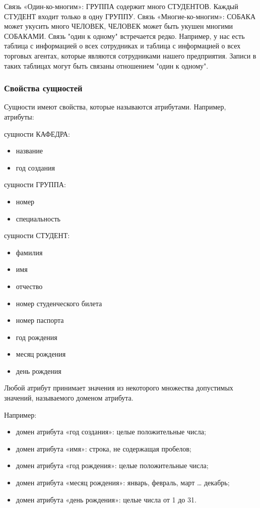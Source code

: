 \documentclass[a4paper]{article}
\begin{document}
Связь «Один-ко-многим»: ГРУППА содержит много СТУДЕНТОВ. Каждый СТУДЕНТ входит только в одну ГРУППУ. Связь «Многие-ко-многим»: СОБАКА может укусить много ЧЕЛОВЕК, ЧЕЛОВЕК может быть укушен многими СОБАКАМИ. Связь "один к одному" встречается редко. Например, у нас есть таблица с информацией о всех сотрудниках и таблица с информацией о всех торговых агентах, которые являются сотрудниками нашего предприятия. Записи в таких таблицах могут быть связаны отношением "один к одному".

\subsubsection{Свойства сущностей}
Сущности имеют свойства, которые называются атрибутами.
Например, атрибуты:

сущности КАФЕДРА:
    \begin{itemize}
      \item название
      \item год создания
    \end{itemize}

сущности ГРУППА:
\begin{itemize}
    \item номер
    \item специальность
\end{itemize}

сущности СТУДЕНТ:
\begin{itemize}
\item фамилия
\item имя
\item отчество
\item номер студенческого билета
\item номер паспорта
\item год рождения
\item месяц рождения
\item день рождения
\end{itemize}

Любой атрибут принимает значения из некоторого множества допустимых значений, называемого доменом атрибута.

Например:
\begin{itemize}
    \item домен атрибута «год создания»: целые положительные числа;
    \item домен атрибута «имя»: строка, не содержащая пробелов;
    \item домен атрибута «год рождения»: целые положительные числа;
    \item домен атрибута «месяц рождения»: январь, февраль, март … декабрь;
    \item домен атрибута «день рождения»: целые числа от 1 до 31.
\end{itemize}
\end{document}
